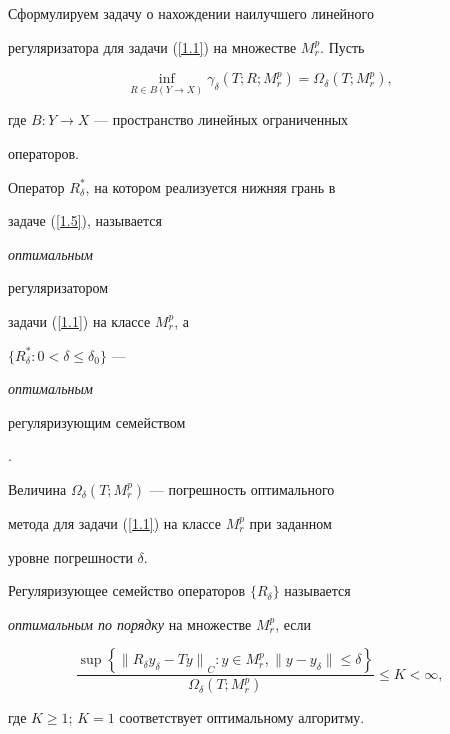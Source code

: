 Сформулируем задачу о нахождении наилучшего линейного


регуляризатора для задачи (\ref{1.1}) на множестве $M_r^p$. Пусть


\begin{equation}\label{1.5}


\inf_{R\in B(Y\rightarrow


X)}\gamma_\delta(T;R;M_r^p)=\Omega_\delta(T;M_r^p),


\end{equation}


где $B:Y\rightarrow X$ --- пространство линейных ограниченных


операторов.





\begin{defns}


Оператор $R_\delta^*$, на котором реализуется нижняя грань в


задаче (\ref{1.5}), называется {\it оптимальным


регуляризатором} задачи (\ref{1.1}) на классе $M_r^p$, а


$\{R_\delta^*: 0<\delta\leq \delta_0\}$ --- {\it оптимальным


регуляризующим семейством}.


\end{defns}





Величина $\Omega_\delta(T;M_r^p)$ --- погрешность оптимального


метода для задачи (\ref{1.1}) на классе $M_r^p$ при заданном


уровне погрешности $\delta$.





\begin{defns}\label{def}


Регуляризующее семейство операторов $\{R_\delta\}$ называется


{\it оптимальным по порядку} на множестве $M_r^p$, если


\begin{equation}\label{1.6}


\frac{\sup\left\{{\|R_\delta y_\delta -T y\|}_C: y \in


M_r^p,\|y-y_\delta\|\leq


\delta\right\}}{\Omega_\delta(T;M_r^p)}\leq K<\infty,


\end{equation}


где $K\geq 1$; $K=1$ соответствует оптимальному алгоритму.


\end{defns}





